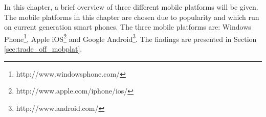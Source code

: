 In this chapter, a brief overview of three different mobile platforms will be given. The mobile platforms in this chapter are chosen due to popularity and which run on current generation smart phones. The three mobile platforms are: Windows Phone\footnote{http://www.windowsphone.com/}, Apple iOS\footnote{http://www.apple.com/iphone/ios/} and Google Android\footnote{http://www.android.com/}. The findings are presented in Section \ref{sec:trade_off_mobplat}. 
